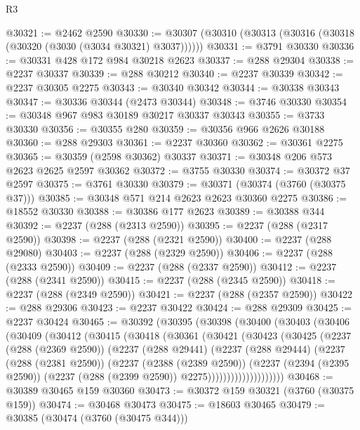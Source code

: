\begin{lexlean}{R3}
\begin{coremodule}
@30321 := @2462 @2590
@30330 := @30307 (@30310 (@30313 (@30316 (@30318 (@30320 (@3030 (@3034 @30321) @3037))))))
@30331 := @3791 @30330
@30336 := @30331 @428 @172 @984 @30218 @2623
@30337 := @288 @29304
@30338 := @2237 @30337
@30339 := @288 @30212
@30340 := @2237 @30339
@30342 := @2237 @30305 @2275
@30343 := @30340 @30342
@30344 := @30338 @30343
@30347 := @30336 @30344 (@2473 @30344)
@30348 := @3746 @30330
@30354 := @30348 @967 @983 @30189 @30217 @30337 @30343
@30355 := @3733 @30330
@30356 := @30355 @280
@30359 := @30356 @966 @2626 @30188
@30360 := @288 @29303
@30361 := @2237 @30360
@30362 := @30361 @2275
@30365 := @30359 (@2598 @30362) @30337
@30371 := @30348 @206 @573 @2623 @2625 @2597 @30362
@30372 := @3755 @30330
@30374 := @30372 @37 @2597
@30375 := @3761 @30330
@30379 := @30371 (@30374 (@3760 (@30375 @37)))
@30385 := @30348 @571 @214 @2623 @2623 @30360 @2275
@30386 := @18552 @30330
@30388 := @30386 @177 @2623
@30389 := @30388 @344
@30392 := @2237 (@288 (@2313 @2590))
@30395 := @2237 (@288 (@2317 @2590))
@30398 := @2237 (@288 (@2321 @2590))
@30400 := @2237 (@288 @29080)
@30403 := @2237 (@288 (@2329 @2590))
@30406 := @2237 (@288 (@2333 @2590))
@30409 := @2237 (@288 (@2337 @2590))
@30412 := @2237 (@288 (@2341 @2590))
@30415 := @2237 (@288 (@2345 @2590))
@30418 := @2237 (@288 (@2349 @2590))
@30421 := @2237 (@288 (@2357 @2590))
@30422 := @288 @29306
@30423 := @2237 @30422
@30424 := @288 @29309
@30425 := @2237 @30424
@30465 := @30392
    (@30395
      (@30398
        (@30400
          (@30403
            (@30406
              (@30409
                (@30412
                  (@30415
                    (@30418
                      (@30361
                        (@30421
                          (@30423
                            (@30425
                              (@2237
                                (@288 (@2369 @2590))
                                (@2237
                                  (@288 @29441)
                                  (@2237
                                    (@288 @29444)
                                    (@2237
                                      (@288 (@2381 @2590))
                                      (@2237
                                        (@2388 (@2389 @2590))
                                        (@2237
                                          (@2394 (@2395 @2590))
                                          (@2237 (@288 (@2399 @2590)) @2275))))))))))))))))))))
@30468 := @30389 @30465 @159 @30360
@30473 := @30372 @159 @30321 (@3760 (@30375 @159))
@30474 := @30468 @30473
@30475 := @18603 @30465
@30479 := @30385 (@30474 (@3760 (@30475 @344)))

\end{coremodule}
\end{lexlean}
